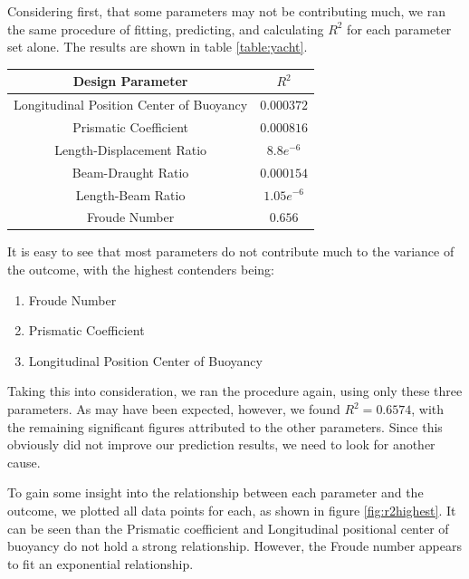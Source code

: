 \documentclass[11pt,a4paper]{article}
\begin{document}
Considering first, that some parameters may not be contributing much, we ran the same procedure of fitting, predicting, and calculating $R^2$ for each parameter set alone. The results are shown in table \ref{table:yacht}.

\begin{center}\label{table:yacht}
 \begin{tabular}{||c | c||} 
 \hline
 Design Parameter & $R^2$ \\ [0.5ex] 
 \hline\hline
 Longitudinal Position Center of Buoyancy & $0.000372$ \\ 
 \hline
 Prismatic Coefficient & $0.000816$ \\
 \hline
 Length-Displacement Ratio & $8.8e^{-6}$ \\
 \hline
 Beam-Draught Ratio & $0.000154$ \\
 \hline
 Length-Beam Ratio & $1.05e^{-6}$ \\
 \hline
 Froude Number & $0.656$ \\ [1ex] 
 \hline
\end{tabular}
\end{center}

It is easy to see that most parameters do not contribute much to the variance of the outcome, with the highest contenders being:

\begin{enumerate}
\item Froude Number
\item Prismatic Coefficient
\item Longitudinal Position Center of Buoyancy
\end{enumerate}

Taking this into consideration, we ran the procedure again, using only these three parameters. As may have been expected, however, we found $R^2 = 0.6574$, with the remaining significant figures attributed to the other parameters. Since this obviously did not improve our prediction results, we need to look for another cause.

To gain some insight into the relationship between each parameter and the outcome, we plotted all data points for each, as shown in figure \ref{fig:r2highest}. It can be seen than the Prismatic coefficient and Longitudinal positional center of buoyancy do not hold a strong relationship. However, the Froude number appears to fit an exponential relationship.
\end{document}
